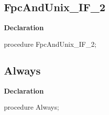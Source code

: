 \documentclass{report}
\newif\ifpdf
\begin{document}
\subsection*{FpcAndUnix{\_}IF{\_}2}
\fi
\label{ok_if_expressions-FpcAndUnix_IF_2}
\begin{list}{}{
\setlength{\itemindent}{0cm}
\setlength{\listparindent}{0cm}
\setlength{\leftmargin}{\evensidemargin}
\addtolength{\leftmargin}{\tmplength}
\settowidth{\labelsep}{X}
\addtolength{\leftmargin}{\labelsep}
\setlength{\labelwidth}{\tmplength}
}
\item[\textbf{Declaration}\hfill]
\ifpdf
\begin{flushleft}
\fi
\begin{ttfamily}
procedure FpcAndUnix{\_}IF{\_}2;\end{ttfamily}

\ifpdf
\end{flushleft}
\fi

\end{list}
\ifpdf
\subsection*{\large{\textbf{Always}}\normalsize\hspace{1ex}\hrulefill}
\else
\subsection*{Always}
\fi
\label{ok_if_expressions-Always}
\begin{list}{}{
\setlength{\itemindent}{0cm}
\setlength{\listparindent}{0cm}
\setlength{\leftmargin}{\evensidemargin}
\addtolength{\leftmargin}{\tmplength}
\settowidth{\labelsep}{X}
\addtolength{\leftmargin}{\labelsep}
\setlength{\labelwidth}{\tmplength}
}
\item[\textbf{Declaration}\hfill]
\ifpdf
\begin{flushleft}
\fi
\begin{ttfamily}
procedure Always;\end{ttfamily}

\ifpdf
\end{flushleft}
\fi

\end{list}
\end{document}
